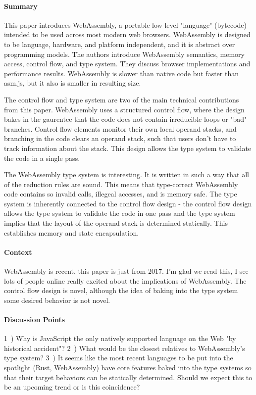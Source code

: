 \paragraph{\textbf{Summary}}
This paper introduces WebAssembly, a portable low-level "language"
(bytecode) intended to be used across most modern web browsers. WebAssembly
is designed to be language, hardware, and platform independent, and it is
abstract over programming models. The authors introduce WebAssembly
semantics, memory access, control flow, and type system. They discuss
browser implementations and performance results. WebAssembly is slower than
native code but faster than asm.js, but it also is smaller in resulting
size.

The control flow and type system are two of the main technical contributions
from this paper. WebAssembly uses a structured control flow, where the
design bakes in the gaurentee that the code does not contain irreducible
loops or "bad" branches. Control flow elements monitor their own local
operand stacks, and branching in the code clears an operand stack, such that
users don't have to track information about the stack. This design allows
the type system to validate the code in a single pass.

The WebAssembly type system is interesting. It is written in such a way
that all of the reduction rules are sound. This means that type-correct
WebAssembly code contains so invalid calls, illegeal accesses, and is memory
safe. The type system is inherently connected to the control flow design -
the control flow design allows the type system to validate the code in one
pass and the type system implies that the layout of the operand stack is
determined statically. This establishes memory and state encapsulation.
\paragraph{\textbf{Context}}
WebAssembly is recent, this paper is just from 2017. I'm glad we read
this, I see lots of people online really excited about the implications of
WebAssembly. The control flow design is novel, although the idea of baking
into the type system some desired behavior is not novel.
\paragraph{\textbf{Discussion Points}}
1~) Why is JavaScript the only natively supported language on the Web "by
historical accident"?
2~) What would be the closest relatives to WebAssembly's type system?
3~) It seems like the most recent languages to be put into the spotlight
(Rust, WebAssembly) have core features baked into the type systems so that
their target behaviors can be statically determined. Should we expect this
to be an upcoming trend or is this coincidence?
